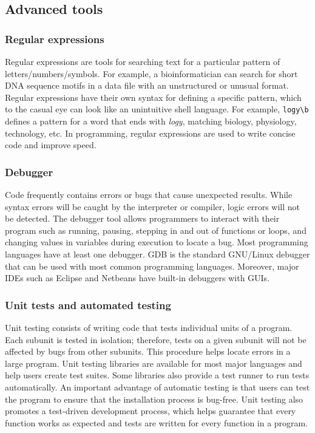 \documentclass[ChapterTOCs,krantz2]{krantz} %
\begin{document}
\subsection{Advanced tools}


\subsubsection{Regular expressions}

Regular expressions are tools for
searching text for a particular pattern of letters/numbers/symbols.  For
example, a bioinformatician can search for short DNA sequence motifs in 
a data file with an unstructured or unusual format.  Regular expressions have their own
syntax for defining a specific pattern, which to the casual eye can look like
an unintuitive shell language. For example, \texttt{logy\textbackslash{}b} defines a pattern for a word
that ends with \emph{logy}, matching biology, physiology, technology, etc.
In programming, regular expressions are
used to write concise code and improve speed. 

\subsubsection{Debugger}

Code frequently contains errors or bugs that cause unexpected results.
While syntax errors will be caught by the interpreter or compiler, 
logic errors will not be detected.
The debugger tool allows programmers to interact with their program such as
running, pausing, stepping in and out of functions or loops, and changing values
in variables during execution to locate a bug.
Most programming languages have at least one debugger.
GDB is the standard GNU/Linux debugger that can be used with most
common programming languages.
Moreover, major IDEs such as Eclipse and Netbeans have built-in debuggers
with GUIs. 

\subsubsection{Unit tests and automated testing}

Unit testing consists of writing
code that tests individual units of a program. 
Each subunit is tested in isolation; therefore, tests 
on a given subunit will not be affected by bugs from other subunits. This
procedure helps locate errors in a large program. 
Unit testing libraries are available for most major languages
and help users create test
suites. Some libraries also
provide a test runner to run tests automatically. An important
advantage of automatic testing is that users can
test the program to ensure that the installation process is bug-free.  Unit
testing also promotes a test-driven development process, which 
helps guarantee that
every function works as expected and tests are written for every function in a
program.
\end{document}
